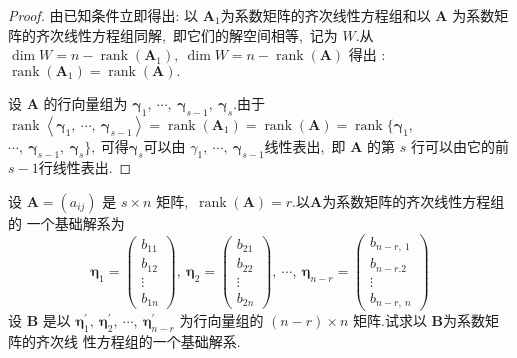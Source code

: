 \begin{proof}
	由已知条件立即得出: 以 $ \boldsymbol{A}_{1}  $为系数矩阵的齐次线性方程组和以 $ \boldsymbol{A} $ 为系数矩 阵的齐次线性方程组同解,\  即它们的解空间相等,\  记为 $ W .$从  $\operatorname{dim} W=n-\operatorname{rank}\left(\boldsymbol{A}_{1}\right) ,\   \operatorname{dim} W=n-\operatorname{rank}(\boldsymbol{A}) $ 得出  :$ \operatorname{rank}\left(\boldsymbol{A}_{1}\right)=\operatorname{rank}(\boldsymbol{A}) .$
	
	设 $\boldsymbol{A} $ 的行向量组为 $ \boldsymbol{\gamma}_1,\  \cdots,\  \boldsymbol{\gamma}_{s-1},\  \boldsymbol{\gamma}_{s}  .$由于 $ \operatorname{rank}\left\langle\boldsymbol{\gamma}_{1},\  \cdots,\  \boldsymbol{\gamma}_{s-1}\right\rangle=\operatorname{rank}\left(\boldsymbol{A}_{1}\right)=\operatorname{rank}(\boldsymbol{A})=\operatorname{rank}\{\boldsymbol{\gamma}_{1},\  $ $\cdots,\  \boldsymbol{\gamma}_{s-1},\ \boldsymbol{\gamma}_s\},\ $可得$\boldsymbol{\gamma}_s$可以由  $\gamma_{1},\  \cdots,\ \boldsymbol{\gamma}_{s-1}$线性表出,\  即 $ \boldsymbol{A} $ 的第 $ s$  行可以由它的前$  s-1  $行线性表出.
\end{proof}
\newpage
\begin{problem}
	设 $ \boldsymbol{A}=\left(a_{i j}\right) $ 是  $s \times n $ 矩阵,\   $\operatorname{rank}(\boldsymbol{A})=r.$以$  \boldsymbol{A}  $为系数矩阵的齐次线性方程组的 一个基础解系为
	$$\boldsymbol{\eta}_{1}=\left(\begin{array}{c}
		b_{11} \\
		b_{12} \\
		\vdots \\
		b_{1 n}
	\end{array}\right),\  \boldsymbol{\eta}_{2}=\left(\begin{array}{c}
		b_{21} \\
		b_{22} \\
		\vdots \\
		b_{2 n}
	\end{array}\right),\  \cdots,\  \boldsymbol{\eta}_{n-r}=\left(\begin{array}{c}
		b_{n-r,\ 1} \\
		b_{n-r .2} \\
		\vdots \\
		b_{n-r,\  n}
	\end{array}\right)$$
	设  $\boldsymbol{B}$  是以 $ \boldsymbol{\eta}_{1}^{\prime},\  \boldsymbol{\eta}_{2}^{\prime},\  \cdots,\  \boldsymbol{\eta}_{n-r}^{\prime} $ 为行向量组的  $(n-r) \times n $ 矩阵.试求以 $ \boldsymbol{B}  $为系数矩阵的齐次线 性方程组的一个基础解系.
\end{problem}
